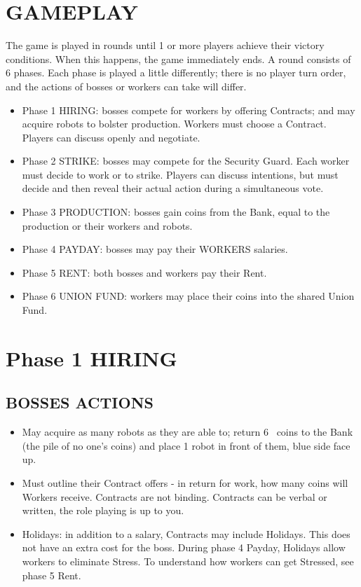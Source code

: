 \section{GAMEPLAY}

    The game is played in rounds until 1 or more players achieve their victory conditions.
    When this happens, the game immediately ends.
    A round consists of 6 phases. Each phase is played a little differently; there is no
    player turn order, and the actions of bosses or workers can take will differ.

    \begin{itemize}
        \item Phase 1 HIRING: bosses compete for workers by offering Contracts; and
        may acquire robots to bolster production. Workers must choose a Contract.
        Players can discuss openly and negotiate.
        \item Phase 2 STRIKE: bosses may compete for the Security Guard. Each worker
        must decide to work or to strike. Players can discuss intentions, but must
        decide and then reveal their actual action during a simultaneous vote.
        \item Phase 3 PRODUCTION: bosses gain coins from the Bank, equal to the production
        or their workers and robots.
        \item Phase 4 PAYDAY: bosses may pay their WORKERS salaries.
        \item Phase 5 RENT: both bosses and workers pay their Rent.
        \item Phase 6 UNION FUND: workers may place their coins into the shared Union
        Fund.
    \end{itemize}



\section{Phase 1 HIRING}

    \subsection{BOSSES ACTIONS}
    
        \begin{itemize}
            \item May acquire as many robots as they are able to; return 6 \faRubleSign\ coins to the Bank
            (the pile of no one's coins) and place 1 robot in front of them, blue side face
            up.
            \item Must outline their Contract offers - in return for work, how many coins will
            Workers receive. Contracts are not binding. Contracts can be verbal or written,
            the role playing is up to you.
            \item Holidays: in addition to a salary, Contracts may include Holidays. This does
            not have an extra cost for the boss. During phase 4 Payday, Holidays allow
            workers to eliminate Stress. To understand how workers can get Stressed,
            see phase 5 Rent.
        \end{itemize}
        
